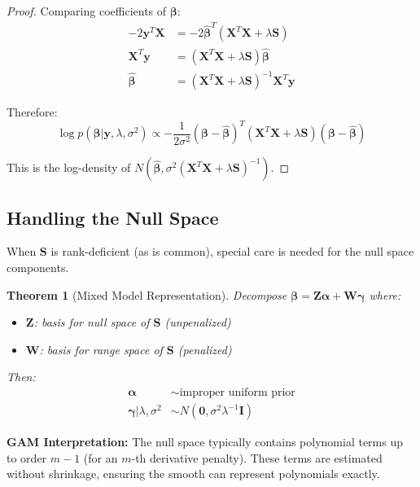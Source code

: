 \documentclass[12pt]{article}
\newtheorem{theorem}{Theorem}
\begin{document}
\begin{proof}
Comparing coefficients of $\bm{\beta}$:
\begin{align}
-2\mathbf{y}^T\mathbf{X} &= -2\hat{\bm{\beta}}^T(\mathbf{X}^T\mathbf{X} + \lambda\mathbf{S}) \\
\mathbf{X}^T\mathbf{y} &= (\mathbf{X}^T\mathbf{X} + \lambda\mathbf{S})\hat{\bm{\beta}} \\
\hat{\bm{\beta}} &= (\mathbf{X}^T\mathbf{X} + \lambda\mathbf{S})^{-1}\mathbf{X}^T\mathbf{y}
\end{align}

Therefore:
\begin{equation}
\log p(\bm{\beta}|\mathbf{y}, \lambda, \sigma^2) \propto -\frac{1}{2\sigma^2}(\bm{\beta} - \hat{\bm{\beta}})^T(\mathbf{X}^T\mathbf{X} + \lambda\mathbf{S})(\bm{\beta} - \hat{\bm{\beta}})
\end{equation}

This is the log-density of $N(\hat{\bm{\beta}}, \sigma^2(\mathbf{X}^T\mathbf{X} + \lambda\mathbf{S})^{-1})$.
\end{proof}

\subsection{Handling the Null Space}

When $\mathbf{S}$ is rank-deficient (as is common), special care is needed for the null space components.

\begin{theorem}[Mixed Model Representation]
Decompose $\bm{\beta} = \mathbf{Z}\bm{\alpha} + \mathbf{W}\bm{\gamma}$ where:
\begin{itemize}
    \item $\mathbf{Z}$: basis for null space of $\mathbf{S}$ (unpenalized)
    \item $\mathbf{W}$: basis for range space of $\mathbf{S}$ (penalized)
\end{itemize}
Then:
\begin{align}
\bm{\alpha} &\sim \text{improper uniform prior} \\
\bm{\gamma} | \lambda, \sigma^2 &\sim N(\mathbf{0}, \sigma^2\lambda^{-1}\mathbf{I})
\end{align}
\end{theorem}

\textbf{GAM Interpretation:} The null space typically contains polynomial terms up to order $m-1$ (for an $m$-th derivative penalty). These terms are estimated without shrinkage, ensuring the smooth can represent polynomials exactly.
\end{document}
